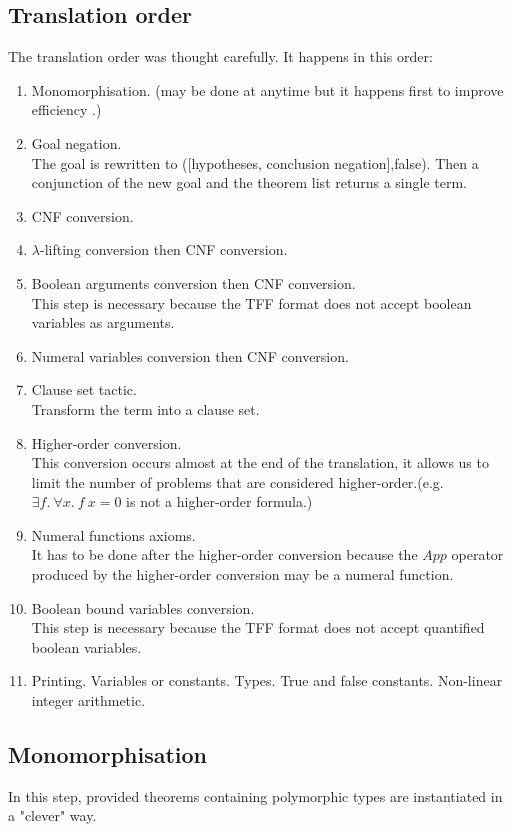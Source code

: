 \documentclass[a4paper, 11pt]{article}
\theoremstyle{plain}
\theoremstyle{definition}
\theoremstyle{remark}
\begin{document}
\subsection{Translation order}
The translation order was thought carefully. It happens in this order: 
\begin{enumerate}    
  \item Monomorphisation. (may be done at anytime but it happens first to improve efficiency \cite{MengP08}.)
  \item Goal negation. 
  \\The goal is rewritten to ([hypotheses, conclusion negation],false).
  Then a conjunction of the new goal and the theorem list returns a single term. 
  \item CNF conversion.
  \item $\lambda$-lifting conversion then CNF conversion. 
  \item Boolean arguments conversion then CNF conversion.
  \\This step is necessary because the TFF format does not accept boolean variables as arguments.
  \item Numeral variables conversion then CNF conversion.  
  \item Clause set tactic. 
  \\ Transform the term into a clause set.      
  \item Higher-order conversion.
  \\ This conversion occurs almost at the end of the translation, it allows us to limit the number of problems that are considered higher-order.(e.g. $\exists f.\ \forall x.\ f\ x = 0$ is not a higher-order formula.)
  \item Numeral functions axioms.
  \\ It has to be done after the higher-order conversion because the $App$ operator produced by the higher-order conversion may be a numeral function. 
  \item Boolean bound variables conversion.  
  \\This step is necessary because the TFF format does not accept quantified boolean variables.
    \item Printing.
    \subitem Variables or constants.  
    \subitem Types.
    \subitem True and false constants.
    \subitem Non-linear integer arithmetic.
\end{enumerate}  
  
\subsection{Monomorphisation}
In this step, provided theorems containing polymorphic types are instantiated in a "clever" way.
  
\end{document}
